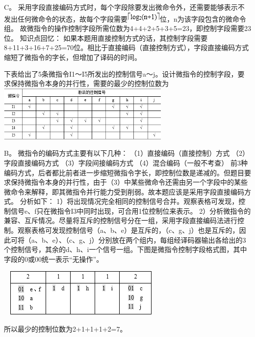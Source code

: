 \begin{solution}C。
采用字段直接编码方式时，每个字段除要发出微命令外，还需要能够表示不发出任何微命令的状态，故每个字段需要\includegraphics[width=0.68750in,height=0.19792in]{computerassets/192b018e4f8f9385b44d3c130841491a.jpeg}位，n为该字段包含的微命令组。
故微指令的操作控制字段所需位数为4+4+2+5+3+5=23，即控制字段需要23位。
知识点回忆：
如果本题用直接控制方式的话，其控制字段需要8+11+3+16+7+25=70位。相比于直接编码（直接控制方式），字段直接编码方式缩短了微指令的字长，但增加了译码的时间。
\end{solution}
\question 下表给出了5条微指令I1～I5所发出的控制信号a～j。设计微指令的控制字段，要求保持微指令本身的并行性，需要的最少的控制位数为
\includegraphics[width=3.33333in,height=1.08333in]{computerassets/5b1bab1abb87d9250f00d12856549ee7.jpeg}
\par{}
\begin{solution}B。 微指令的编码方式主要有以下几种： （1）直接编码（直接控制）方式
（2）字段直接编码方式 （3）字段间接编码方式 （4）混合编码（一般不考查）
前3种编码方式，后者都比前者进一步缩短微指令字长，即控制位数是递减的。但题目要求保持微指令本身的并行性，由于（3）中某些微命令还需由另一个字段中的某些微命令来解释，即其微指令并行能力受到削弱。故本题应该是采用字段直接编码方式。
分析如下：
1）将出现情况完全相同的控制信号合并。观察表格可发现，控制信号e、f只在微指令I3中同时出现，可合用1位控制位来表示。
2）分析微指令的兼容、互斥情况。尽量将互斥的控制信号分在一组，采用字段直接编码法进行控制。观察表格可发现控制信号（a、b、e）是互斥的，（c、g、j）也是互斥的，因此可将（a、b、e）、（c、g、j）分别放在两个组内，每组经译码器输出各给出的3个控制信号，其余的d、h、i一个信号一组。下图是微指令控制字段格式图，其中字段的0或00统一表示``无操作''。

~
\includegraphics[width=3.02083in,height=0.93750in]{computerassets/4e16b737bedeef5f63b46047bbfe2996.jpeg}~

所以最少的控制位数为2+1+1+1+2=7。
\end{solution}

